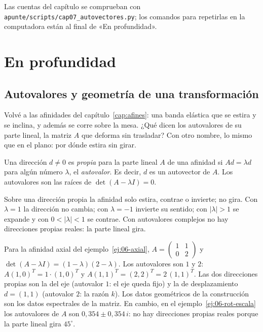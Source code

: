 
Las cuentas del capítulo se comprueban con \texttt{apunte/scripts/cap07\_autovectores.py}; los
comandos para repetirlas en la computadora están al final de «En profundidad».

\section{En profundidad}

\subsection{Autovalores y geometría de una transformación}\label{sec:autovalores-geom}

Volvé a las afinidades del capítulo~\ref{cap:afines}: una banda elástica que se estira y se
inclina, y además se corre sobre la mesa. ¿Qué dicen los autovalores de su parte lineal, la
matriz \(A\) que deforma sin trasladar? Con otro nombre, lo mismo que en el plano: por dónde
estira sin girar.

\begin{definicion}\label{def:06-direccion-propia}
Una dirección \(d\neq0\) es \emph{propia} para la parte lineal \(A\) de una afinidad si
\(Ad=\lambda d\) para algún número \(\lambda\), el \emph{autovalor}. Es decir, \(d\) es un
autovector de \(A\). Los autovalores son las raíces de \(\det(A-\lambda I)=0\).
\end{definicion}

Sobre una dirección propia la afinidad solo estira, contrae o invierte; no gira. Con
\(\lambda=1\) la dirección no cambia; con \(\lambda=-1\) invierte su sentido; con
\(|\lambda|>1\) se expande y con \(0<|\lambda|<1\) se contrae. Con autovalores complejos no
hay direcciones propias reales: la parte lineal gira.

\begin{ejemplo}\label{ej:06-autovalores-axial}
Para la afinidad axial del ejemplo~\ref{ej:06-axial}, \(A=\begin{pmatrix}1&1\\0&2\end{pmatrix}\)
y \(\det(A-\lambda I)=(1-\lambda)(2-\lambda)\). Los autovalores son \(1\) y \(2\):
\(A(1,0)^T=1\cdot(1,0)^T\) y \(A(1,1)^T=(2,2)^T=2\,(1,1)^T\). Las dos direcciones propias son la del eje (autovalor \(1\): el eje queda fijo) y la de
desplazamiento \(d=(1,1)\) (autovalor \(2\): la razón \(k\)). Los datos geométricos de la
construcción son los datos espectrales de la matriz. En cambio, en el
ejemplo~\ref{ej:06-rot-escala} los autovalores de \(A\) son \(0{,}354\pm0{,}354\,i\): no hay
direcciones propias reales porque la parte lineal gira \(45^\circ\).
\end{ejemplo}

